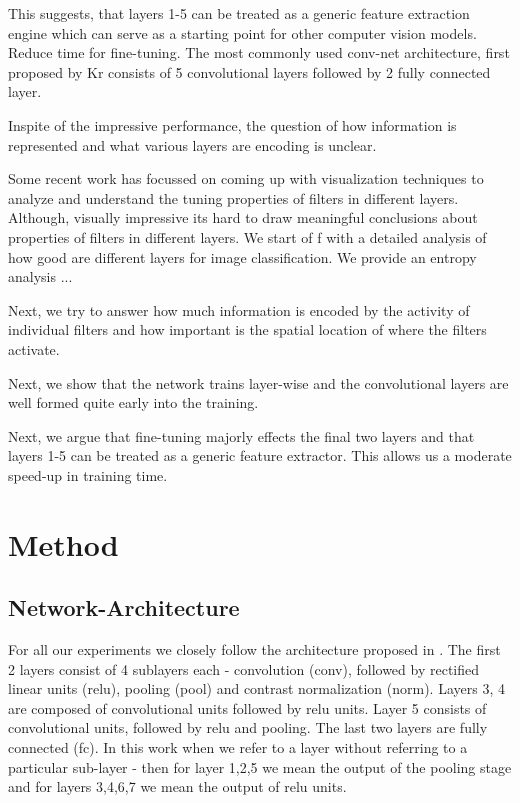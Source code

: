 \documentclass[runningheads]{llncs}
\begin{document}
This suggests, that layers 1-5 can be treated as a generic feature extraction engine which can serve as a starting point for other computer vision models. Reduce time for fine-tuning. 
The most commonly used conv-net architecture, first proposed by Kr consists of 5 convolutional layers followed by 2 fully connected layer. 
 
Inspite of the impressive performance, the question of how information is represented and what various layers are encoding is unclear. 

Some recent work has focussed on coming up with visualization techniques to analyze and understand the tuning properties of filters in different layers. Although, visually impressive its hard to draw meaningful conclusions about properties of filters in different layers. We start of f with a detailed analysis of how good are different layers for image classification. We provide an entropy analysis ...

Next, we try to answer how much information is encoded by the activity of individual filters and how important is the spatial location of where the filters activate.      

Next, we show that the network trains layer-wise and the convolutional layers are well formed quite early into the training. 

Next, we argue that fine-tuning majorly effects the final two layers and that layers 1-5 can be treated as a generic feature extractor. This allows us a moderate speed-up in training time. 

\section{Method}
\subsection{Network-Architecture}
For all our experiments we closely follow the architecture proposed in \cite{alex}. The first 2 layers consist of 4 sublayers each - convolution (conv), followed by rectified linear units (relu), pooling (pool) and contrast normalization (norm). Layers 3, 4 are composed of convolutional units followed by relu units. Layer 5 consists of convolutional units, followed by relu and pooling. The last two layers are fully connected (fc). In this work when we refer to a layer without referring to a particular sub-layer - then for layer 1,2,5 we mean the output of the pooling stage and for layers 3,4,6,7 we mean the output of relu units.
\end{document}
